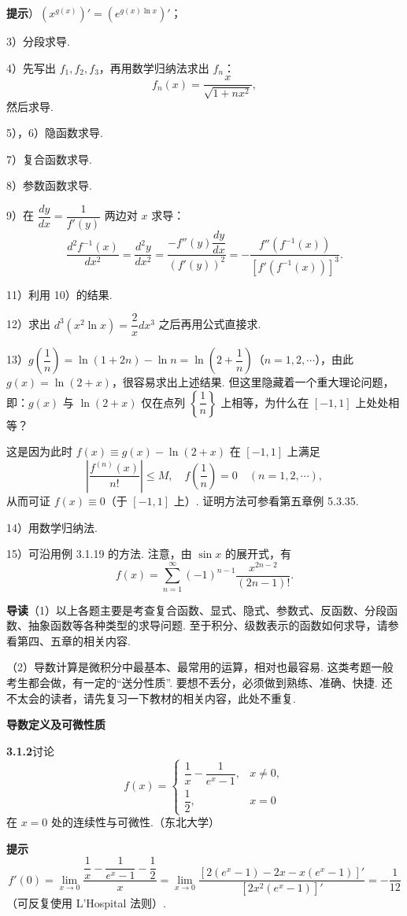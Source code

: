 \documentclass[UTF8,12pt,a4paper,fontset=fandol]{ctexart}
\begin{document}
\noindent\textbf{提示}）$(x^{g(x)})'=(e^{g(x)\ln x})'$；

3）分段求导.

4）先写出 $f_1,f_2,f_3$，再用数学归纳法求出 $f_n$：
\[
  f_n(x)=\frac{x}{\sqrt{1+nx^2}},
\]
然后求导.

5），6）隐函数求导.

7）复合函数求导.

8）参数函数求导.

9）在 $\dfrac{dy}{dx}=\dfrac1{f'(y)}$ 两边对 $x$ 求导：
\[
  \frac{d^2f^{-1}(x)}{dx^2}=\frac{d^2y}{dx^2}
  =\frac{-f''(y)\dfrac{dy}{dx}}{(f'(y))^2}
  =-\frac{f''(f^{-1}(x))}{[f'(f^{-1}(x))]^3}.
\]

11）利用 10）的结果.

12）求出 $d^3(x^2\ln x)=\dfrac2x dx^3$ 之后再用公式直接求.

13）$g\left(\dfrac1n\right)=\ln(1+2n)-\ln n=\ln\left(2+\dfrac1n\right)$（$n=1,2,\cdots$），由此 $g(x)=\ln(2+x)$，很容易求出上述结果. 但这里隐藏着一个重大理论问题，即：$g(x)$ 与 $\ln(2+x)$ 仅在点列 $\left\{\dfrac1n\right\}$ 上相等，为什么在 $[-1,1]$ 上处处相等？

这是因为此时 $f(x)\equiv g(x)-\ln(2+x)$ 在 $[-1,1]$ 上满足
\[
  \left|\frac{f^{(n)}(x)}{n!}\right|\le M,\quad f\left(\frac1n\right)=0\quad(n=1,2,\cdots),
\]
从而可证 $f(x)\equiv0$（于 $[-1,1]$ 上）. 证明方法可参看第五章例 5.3.35.

14）用数学归纳法.

15）可沿用例 3.1.19 的方法. 注意，由 $\sin x$ 的展开式，有
\[
  f(x)=\sum_{n=1}^\infty(-1)^{n-1}\frac{x^{2n-2}}{(2n-1)!}.
\]

\noindent\textbf{导读}\quad （1）以上各题主要是考查复合函数、显式、隐式、参数式、反函数、分段函数、抽象函数等各种类型的求导问题. 至于积分、级数表示的函数如何求导，请参看第四、五章的相关内容.

（2）导数计算是微积分中最基本、最常用的运算，相对也最容易. 这类考题一般考生都会做，有一定的“送分性质”. 要想不丢分，必须做到熟练、准确、快捷. 还不太会的读者，请先复习一下教材的相关内容，此处不重复.

\noindent\textbf{导数定义及可微性质}

\noindent\textbf{3.1.2}\quad 讨论
\[
f(x)=
\begin{cases}
\dfrac1x-\dfrac1{e^x-1}, & x\ne0,\\
\dfrac12, & x=0
\end{cases}
\]
在 $x=0$ 处的连续性与可微性.（东北大学）

\noindent\textbf{提示}\quad
\[
  f'(0)=\lim_{x\to0}\frac{\dfrac1x-\dfrac1{e^x-1}-\dfrac12}{x}
  =\lim_{x\to0}\frac{[2(e^x-1)-2x-x(e^x-1)]'}{[2x^2(e^x-1)]'}
  =-\frac1{12}
\]
（可反复使用 L'Hospital 法则）.
\end{document}
